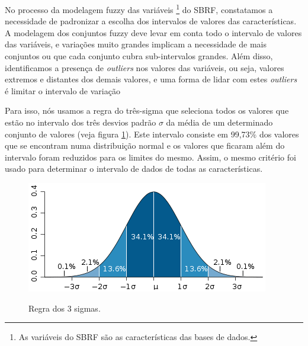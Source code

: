 \documentclass[template.tex]{subfiles}
\begin{document}
No processo da modelagem fuzzy das variáveis \footnote{As variáveis do SBRF são as características das bases de dados.} do SBRF, constatamos a necessidade de padronizar a escolha dos intervalos de valores das características. A modelagem dos conjuntos fuzzy deve levar em conta todo o intervalo de valores das variáveis, e variações muito grandes implicam a necessidade de mais conjuntos ou que cada conjunto cubra sub-intervalos grandes. Além disso, identificamos a presença de \textit{outliers} nos valores das variáveis, ou seja, valores extremos e distantes dos demais valores, e uma forma de lidar com estes \textit{outliers} é limitar o intervalo de variação



Para isso, nós usamos a regra do três-sigma \cite{kazmier2004schaum} que seleciona todos os valores que estão no intervalo dos três desvios padrão $\sigma$ da média de um determinado conjunto de valores (veja figura \ref{figura:regra_3_sigmas}). Este intervalo consiste em 99,73\% dos valores que se encontram numa distribuição normal e os valores que ficaram além do intervalo foram reduzidos para os limites do mesmo. Assim, o mesmo critério foi usado para determinar o intervalo de dados de todas as características. 

\begin{figure}[h]
\caption{Regra dos 3 sigmas.}
\centering
\includegraphics[scale=0.85]{regra-dos-3-sigma.png}
\label{figura:regra_3_sigmas}
\end{figure}
\end{document}
